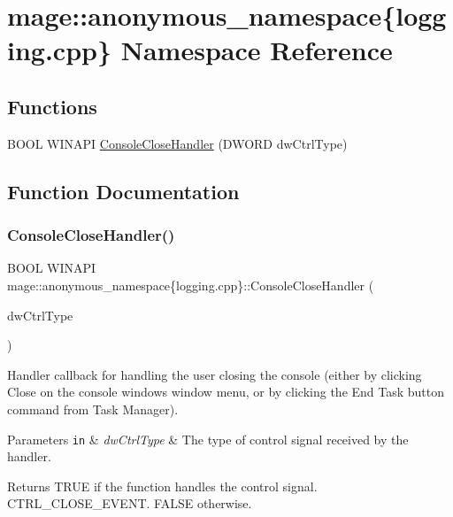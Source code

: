 \hypertarget{namespacemage_1_1anonymous__namespace_02logging_8cpp_03}{}\section{mage\+:\+:anonymous\+\_\+namespace\{logging.\+cpp\} Namespace Reference}
\label{namespacemage_1_1anonymous__namespace_02logging_8cpp_03}
\subsection*{Functions}
\begin{DoxyCompactItemize}
\item 
B\+O\+OL W\+I\+N\+A\+PI \mbox{\hyperlink{namespacemage_1_1anonymous__namespace_02logging_8cpp_03_afcffc24b27bfed3ade712bd0d8401230}{Console\+Close\+Handler}} (D\+W\+O\+RD dw\+Ctrl\+Type)
\end{DoxyCompactItemize}


\subsection{Function Documentation}
\mbox{\label{namespacemage_1_1anonymous__namespace_02logging_8cpp_03_afcffc24b27bfed3ade712bd0d8401230}} 
\subsubsection{\texorpdfstring{Console\+Close\+Handler()}{ConsoleCloseHandler()}}
{\footnotesize\ttfamily B\+O\+OL W\+I\+N\+A\+PI mage\+::anonymous\+\_\+namespace\{logging.\+cpp\}\+::Console\+Close\+Handler (\begin{DoxyParamCaption}\item[{D\+W\+O\+RD}]{dw\+Ctrl\+Type }\end{DoxyParamCaption})}

Handler callback for handling the user closing the console (either by clicking Close on the console window\textquotesingle{}s window menu, or by clicking the End Task button command from Task Manager).


\begin{DoxyParams}[1]{Parameters}
\mbox{\tt in}  & {\em dw\+Ctrl\+Type} & The type of control signal received by the handler. \\
\hline
\end{DoxyParams}
\begin{DoxyReturn}{Returns}
{\ttfamily T\+R\+UE} if the function handles the control signal. {\ttfamily C\+T\+R\+L\+\_\+\+C\+L\+O\+S\+E\+\_\+\+E\+V\+E\+NT}. {\ttfamily F\+A\+L\+SE} otherwise. 
\end{DoxyReturn}
